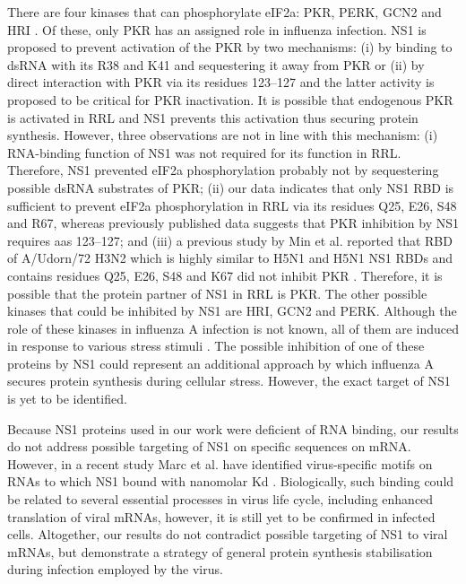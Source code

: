 		There are four kinases that can phosphorylate \gls{eIF2a}: \gls{PKR}, \gls{PERK}, \gls{GCN2} and \gls{HRI} \parencite{Donnelly2013}. Of these, only \gls{PKR} has an assigned role in influenza infection. NS1 is proposed to prevent activation of the \gls{PKR} by two mechanisms: (i) by binding to dsRNA with its R38 and K41 and sequestering it away from \gls{PKR} \parencite{Lu1995} or (ii) by direct interaction with \gls{PKR} via its residues 123--127 \parencite{Min2007} and the latter activity is proposed to be critical for \gls{PKR} inactivation. It is possible that endogenous \gls{PKR} is activated in \gls{RRL} and \gls{NS1} prevents this activation thus securing protein synthesis. However, three observations are not in line with this mechanism: (i) RNA-binding function of NS1 was not required for its function in \gls{RRL}. Therefore, NS1 prevented \gls{eIF2a} phosphorylation probably not by sequestering possible dsRNA substrates of PKR; (ii) our data indicates that only \gls{NS1} \gls{RBD} is sufficient to prevent \gls{eIF2a} phosphorylation in RRL via its residues Q25, E26, S48 and R67, whereas previously published data suggests that PKR inhibition by NS1 requires \glspl{aa} 123--127; and (iii) a previous study by Min et al. reported that \gls{RBD} of A/Udorn/72 H3N2 which is highly similar to H5N1 and H5N1 NS1 \glspl{RBD} and contains residues Q25, E26, S48 and K67 did not inhibit \gls{PKR} \parencite{Min2007}. Therefore, it is possible that the protein partner of NS1 in \gls{RRL} is \gls{PKR}. The other possible kinases that could be inhibited by \gls{NS1} are \gls{HRI}, \gls{GCN2} and \gls{PERK}. Although the role of these kinases in influenza A infection is not known,  all of them are induced in response to various stress stimuli \parencite{Donnelly2013}. The possible inhibition of one of these proteins by \gls{NS1} could represent an additional approach by which influenza A secures protein synthesis during cellular stress. However, the exact target of NS1 is yet to be identified. 

		Because NS1 proteins used in our work were deficient of RNA binding, our results do not address possible targeting of NS1 on specific sequences on mRNA. However, in a recent study Marc et al. have identified virus-specific motifs on RNAs to which NS1 bound with nanomolar \gls{Kd} \parencite{Marc2013}. Biologically, such binding could be related to several essential processes in virus life cycle, including enhanced translation of viral mRNAs, however, it is still yet to be confirmed in infected cells. Altogether, our results do not contradict possible targeting of NS1 to viral mRNAs, but demonstrate a strategy of general protein synthesis stabilisation during infection employed by the virus. 
		
